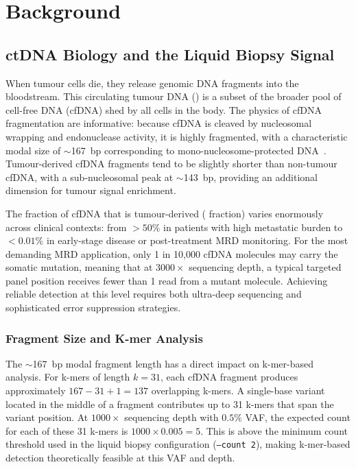 \section{Background}
\label{sec:background}

\subsection{ctDNA Biology and the Liquid Biopsy Signal}

When tumour cells die, they release genomic DNA fragments into the bloodstream.
This circulating tumour DNA (\ctDNA{}) is a subset of the broader pool of
cell-free DNA (cfDNA) shed by all cells in the body.  The physics of cfDNA
fragmentation are informative: because cfDNA is cleaved by nucleosomal wrapping
and endonuclease activity, it is highly fragmented, with a characteristic modal
size of $\sim$167~bp corresponding to mono-nucleosome-protected
DNA~\cite{mouliere2018enhanced}.  Tumour-derived cfDNA fragments tend to be
slightly shorter than non-tumour cfDNA, with a sub-nucleosomal peak at
$\sim$143~bp, providing an additional dimension for tumour signal enrichment.

The fraction of cfDNA that is tumour-derived (\ctDNA{} fraction) varies
enormously across clinical contexts: from $>50\%$ in patients with high
metastatic burden to $<0.01\%$ in early-stage disease or post-treatment MRD
monitoring.  For the most demanding MRD application, only 1 in 10,000 cfDNA
molecules may carry the somatic mutation, meaning that at $3000\times$ sequencing
depth, a typical targeted panel position receives fewer than 1 read from a
mutant molecule.  Achieving reliable detection at this level requires both
ultra-deep sequencing and sophisticated error suppression strategies.

\subsubsection{Fragment Size and K-mer Analysis}

The $\sim$167~bp modal fragment length has a direct impact on k-mer-based
analysis.  For k-mers of length $k = 31$, each cfDNA fragment produces
approximately $167 - 31 + 1 = 137$ overlapping k-mers.  A single-base variant
located in the middle of a fragment contributes up to 31 k-mers that span the
variant position.  At $1000\times$ sequencing depth with $0.5\%$ VAF, the
expected count for each of these 31 k-mers is $1000 \times 0.005 = 5$.  This
is above the minimum count threshold used in the \km{} liquid biopsy
configuration (\texttt{--count 2}), making k-mer-based detection theoretically
feasible at this VAF and depth.

